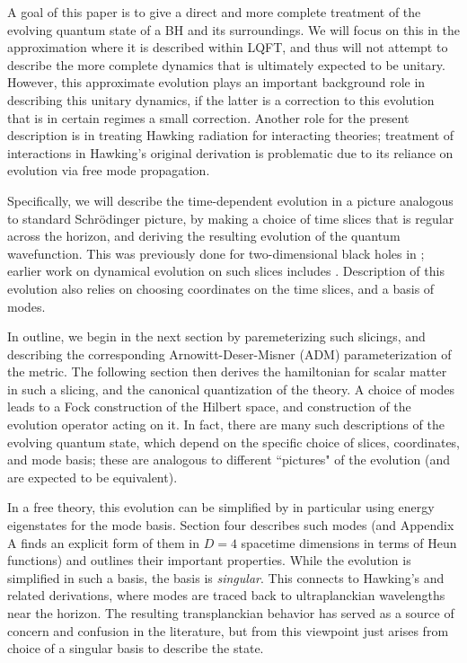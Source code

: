 \documentclass[12pt]{article}
\numberwithin{equation}{section}
\begin{document}
A goal of this paper is to give a direct and more complete treatment of the evolving quantum state of a BH and its surroundings.  We will focus on this in the approximation where it is described within LQFT, and thus will not attempt to describe the more complete dynamics that is ultimately expected to be unitary.  However, this approximate evolution plays an important background role in describing this unitary dynamics, if the latter is a correction to this evolution that is in certain regimes a small correction.  Another role for the present description is in treating Hawking radiation for interacting theories; treatment of interactions in Hawking's original derivation is problematic due to its reliance on evolution via free mode propagation.

Specifically, we will describe the time-dependent evolution in a picture analogous to standard Schr\"odinger picture, by making a choice of time slices that is regular across the horizon, and deriving the resulting evolution of the quantum wavefunction.  This was previously done for two-dimensional black holes in \cite{SEHS,SE2d}; earlier work on dynamical evolution on such slices includes \cite{MeWe1,MeWe2,BHS,HoSi}.  
  Description of this evolution also relies on choosing coordinates on the time slices, and a basis of modes.

In outline, we begin in the next section by paremeterizing such slicings, and describing the corresponding Arnowitt-Deser-Misner (ADM)  parameterization of the metric.  The following section then derives the hamiltonian for scalar matter in such a slicing, and the canonical quantization of the theory.  A choice of modes  leads to a Fock construction of the Hilbert space, and construction of the evolution operator acting on it.   In fact, there are many such descriptions of the evolving quantum state, which depend on the specific choice of slices, coordinates, and mode basis; these are analogous to different ``pictures" of the evolution (and are expected to be equivalent).  

In a free theory, this evolution can be simplified by in particular using energy eigenstates for the mode basis.  Section four describes such modes (and Appendix A finds an explicit form of them in $D=4$ spacetime dimensions in terms of Heun functions) and outlines their important properties.  While the evolution is simplified in such a basis, the basis is {\it singular}.  This connects to Hawking's and related derivations, where modes are traced back to ultraplanckian wavelengths near the horizon.  The resulting transplanckian behavior has served as a source of concern and confusion in the literature, but from this viewpoint just arises from choice of  a singular basis to describe the state.
\end{document}
